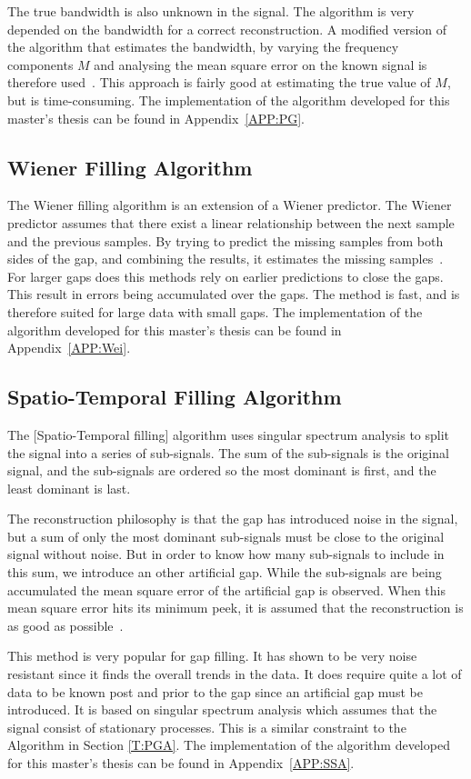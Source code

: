 The true bandwidth is also unknown in the signal. The  algorithm is very depended on the bandwidth for a correct reconstruction. A modified version of the algorithm that estimates the bandwidth, by varying the frequency components $M$ and analysing the mean square error on the known signal is therefore used~\cite{RefWorks:13}. This approach is fairly good at estimating the true value of $M$, but is time-consuming. The implementation of the algorithm developed for this master's thesis can be found in Appendix~\ref{APP:PG}.

\subsection{Wiener Filling Algorithm}
The Wiener filling algorithm is an extension of a Wiener predictor. The Wiener predictor assumes that there exist a linear relationship between the next sample and the previous samples. By trying to predict the missing samples from both sides of the gap, and combining the results, it estimates the missing samples~\citep{RefWorks:14}. For larger gaps does this methods rely on earlier predictions to close the gaps. This result in errors being accumulated over the gaps. The method is fast, and is therefore suited for large data with small gaps. The implementation of the algorithm developed for this master's thesis can be found in Appendix~\ref{APP:Wei}.

\subsection{Spatio-Temporal Filling Algorithm}
The [Spatio-Temporal filling] algorithm uses singular spectrum analysis to split the signal into a series of sub-signals. The sum of the sub-signals is the original signal, and the sub-signals are ordered so the most dominant is first, and the least dominant is last. 

The reconstruction philosophy is that the gap has introduced noise in the signal, but a sum of only the most dominant sub-signals must be close to the original signal without noise. But in order to know how many sub-signals to include in this sum, we introduce an other artificial gap. While the sub-signals are being accumulated the mean square error of the artificial gap is observed. When this mean square error hits its minimum peek, it is assumed that the reconstruction is as good as possible~\cite{RefWorks:15}.

This method is very popular for gap filling. It has shown to be very noise resistant since it finds the overall trends in the data. It does require quite a lot of data to be known post and prior to the gap since an artificial gap must be introduced. It is based on singular spectrum analysis which assumes that the signal consist of stationary processes. This is a similar constraint to the  Algorithm in Section \ref{T:PGA}. The implementation of the algorithm developed for this master's thesis can be found in Appendix~\ref{APP:SSA}.

